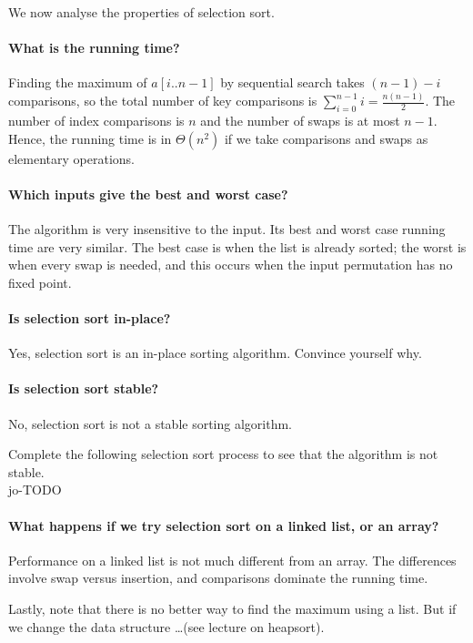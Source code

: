 We now analyse the properties of selection sort.

\paragraph{What is the running time?}
Finding the maximum of $a[i..n-1]$ by sequential search takes $(n-1) - i$ 
comparisons, so the total number of key comparisons is $\sum_{i=0}^{n-1} i  = \frac{n(n-1)}{2}$.
The number of index comparisons is $n$ and the number of swaps is at most $n - 1$.
Hence, the running time is in $\Theta(n^2)$ if we take comparisons and swaps as 
elementary operations.

\paragraph{Which inputs give the best and worst case?}
The algorithm is very insensitive to the input. 
Its best and worst case running time are very similar. 
The best case is when the list is already sorted; the worst is when every swap is needed, 
and this occurs when the input permutation has no fixed point.

\paragraph{Is selection sort in-place?}
Yes, selection sort is an in-place sorting algorithm. Convince yourself why.

\paragraph{Is selection sort stable?}
No, selection sort is not a stable sorting algorithm.
\begin{Boxample}[0]
Complete the following selection sort process to see that the algorithm is not stable.\\
jo-TODO
\end{Boxample}

\paragraph{What happens if we try selection sort on a linked list, or an array?}
Performance on a linked list is not much different from an array. 
The differences involve swap versus insertion, and comparisons dominate the running time.

Lastly, note that there is no better way to find the maximum using a list. 
But if we change the data structure \dots (see lecture on heapsort).




